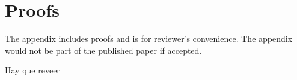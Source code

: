 \appendix
\section{Proofs}
The appendix includes proofs and is for reviewer's convenience. The appendix would not be part of the published paper if accepted. 

Hay que reveer








